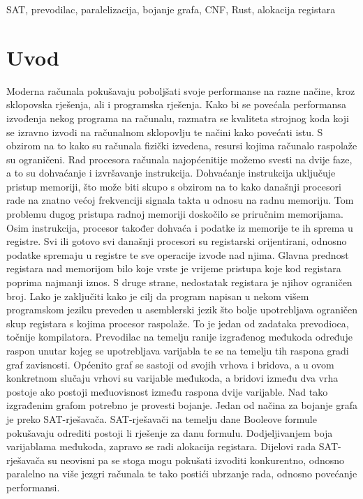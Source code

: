\documentclass[conference]{IEEEtran}
\begin{document}
\begin{IEEEkeywords}
SAT, prevodilac, paralelizacija, bojanje grafa, CNF, Rust, alokacija registara
\end{IEEEkeywords}

\section{Uvod}
Moderna računala pokušavaju poboljšati svoje performanse na razne načine, kroz sklopovska rješenja, ali i programska rješenja. Kako bi se povećala performansa izvođenja nekog programa na računalu, razmatra se kvaliteta strojnog koda koji se izravno izvodi na računalnom sklopovlju te načini kako povećati istu. S obzirom na to kako su računala fizički izvedena, resursi kojima računalo raspolaže su ograničeni. Rad procesora računala najopćenitije možemo svesti na dvije faze, a to su dohvaćanje i izvršavanje instrukcija. Dohvaćanje instrukcija uključuje pristup memoriji, što može biti skupo s obzirom na to kako današnji procesori rade na znatno većoj frekvenciji signala takta u odnosu na radnu memoriju. Tom problemu dugog pristupa radnoj memoriji doskočilo se priručnim memorijama. Osim instrukcija, procesor također dohvaća i podatke iz memorije te ih sprema u registre. Svi ili gotovo svi današnji procesori su registarski orijentirani, odnosno podatke spremaju u registre te sve operacije izvode nad njima. Glavna prednost registara nad memorijom bilo koje vrste je vrijeme pristupa koje kod registara poprima najmanji iznos. S druge strane, nedostatak registara je njihov ograničen broj. Lako je zaključiti kako je cilj da program napisan u nekom višem programskom jeziku preveden u asemblerski jezik što bolje upotrebljava ograničen skup registara s kojima procesor raspolaže. To je jedan od zadataka prevodioca, točnije kompilatora. Prevodilac na temelju ranije izgrađenog međukoda određuje raspon unutar kojeg se upotrebljava varijabla te se na temelju tih raspona gradi graf zavisnosti. Općenito graf se sastoji od svojih vrhova i bridova, a u ovom konkretnom slučaju vrhovi su varijable međukoda, a bridovi između dva vrha postoje ako postoji međuovisnost između raspona dvije varijable. Nad tako izgrađenim grafom potrebno je provesti bojanje. Jedan od načina za bojanje grafa je preko SAT-rješavača. SAT-rješavači na temelju dane Booleove formule pokušavaju odrediti postoji li rješenje za danu formulu. Dodjeljivanjem boja varijablama međukoda, zapravo se radi alokacija registara. Dijelovi rada SAT-rješavača su neovisni pa se stoga mogu pokušati izvoditi konkurentno, odnosno paralelno na više jezgri računala te tako postići ubrzanje rada, odnosno povećanje performansi.
\end{document}
